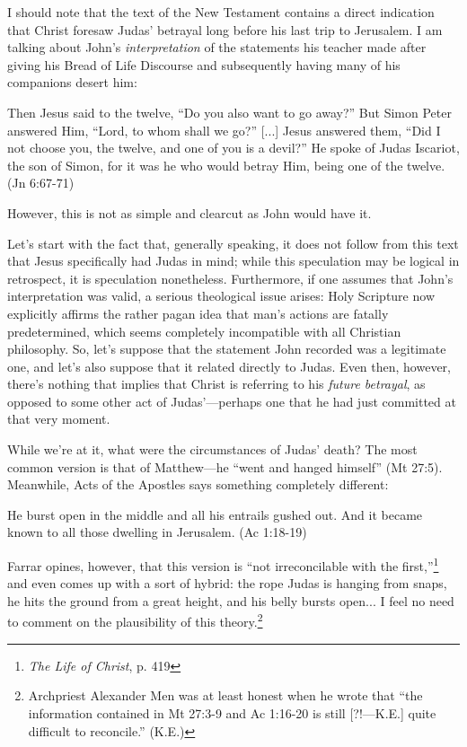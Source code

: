 I should note that the text of the New Testament contains a direct indication that Christ foresaw Judas' betrayal long before his last trip to Jerusalem. I am talking about John's \emph{interpretation} of the statements his teacher made after giving his Bread of Life Discourse and subsequently having many of his companions desert him:

\begin{smallquote}
    Then Jesus said to the twelve, ``Do you also want to go away?'' But Simon Peter answered Him, ``Lord, to whom shall we go?'' [...] Jesus answered them, ``Did I not choose you, the twelve, and one of you is a devil?'' He spoke of Judas Iscariot, the son of Simon, for it was he who would betray Him, being one of the twelve. (Jn 6:67-71)
\end{smallquote}
However, this is not as simple and clearcut as John would have it.

Let's start with the fact that, generally speaking, it does not follow from this text that Jesus specifically had Judas in mind; while this speculation may be logical in retrospect, it is speculation nonetheless. Furthermore, if one assumes that John's interpretation was valid, a serious theological issue arises: Holy Scripture now explicitly affirms the rather pagan idea that man's actions are fatally predetermined, which seems completely incompatible with all Christian philosophy. So, let's suppose that the statement John recorded was a legitimate one, and let's also suppose that it related directly to Judas. Even then, however, there's nothing that implies that Christ is referring to his \emph{future betrayal}, as opposed to some other act of Judas'---perhaps one that he had just committed at that very moment.

While we're at it, what were the circumstances of Judas' death? The most common version is that of Matthew---he ``went and hanged himself'' (Mt 27:5). Meanwhile, Acts of the Apostles says something completely different:

\begin{smallquote}
    He burst open in the middle and all his entrails gushed out. And it became known to all those dwelling in Jerusalem. (Ac 1:18-19)
\end{smallquote}
Farrar opines, however, that this version is ``not irreconcilable with the first,''\footnote{\emph{The Life of Christ}, p. 419} and even comes up with a sort of hybrid: the rope Judas is hanging from snaps, he hits the ground from a great height, and his belly bursts open... I feel no need to comment on the plausibility of this theory.\footnote{Archpriest Alexander Men was at least honest when he wrote that ``the information contained in Mt 27:3-9 and Ac 1:16-20 is still [?!---K.E.] quite difficult to reconcile.'' (K.E.)}

